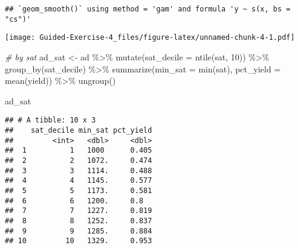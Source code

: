 \documentclass[
]{article}
\newenvironment{Shaded}{\begin{snugshade}}{\end{snugshade}}
\newcommand{\AttributeTok}[1]{\textcolor[rgb]{0.77,0.63,0.00}{#1}}
\newcommand{\CommentTok}[1]{\textcolor[rgb]{0.56,0.35,0.01}{\textit{#1}}}
\newcommand{\DecValTok}[1]{\textcolor[rgb]{0.00,0.00,0.81}{#1}}
\newcommand{\FunctionTok}[1]{\textcolor[rgb]{0.00,0.00,0.00}{#1}}
\newcommand{\NormalTok}[1]{#1}
\newcommand{\OtherTok}[1]{\textcolor[rgb]{0.56,0.35,0.01}{#1}}
\newcommand{\SpecialCharTok}[1]{\textcolor[rgb]{0.00,0.00,0.00}{#1}}
\newcommand{\StringTok}[1]{\textcolor[rgb]{0.31,0.60,0.02}{#1}}
\begin{document}
\begin{Shaded}
\end{Shaded}

\begin{verbatim}
## `geom_smooth()` using method = 'gam' and formula 'y ~ s(x, bs = "cs")'
\end{verbatim}

\texttt{[image: Guided-Exercise-4\_files/figure-latex/unnamed-chunk-4-1.pdf]}

\begin{Shaded}
\begin{Highlighting}[]
\CommentTok{\# by sat}
\NormalTok{ad\_sat }\OtherTok{\textless{}{-}}\NormalTok{ ad }\SpecialCharTok{\%\textgreater{}\%}
  \FunctionTok{mutate}\NormalTok{(}\AttributeTok{sat\_decile =} \FunctionTok{ntile}\NormalTok{(sat, }\DecValTok{10}\NormalTok{)) }\SpecialCharTok{\%\textgreater{}\%}
  \FunctionTok{group\_by}\NormalTok{(sat\_decile) }\SpecialCharTok{\%\textgreater{}\%}
  \FunctionTok{summarize}\NormalTok{(}\AttributeTok{min\_sat =} \FunctionTok{min}\NormalTok{(sat),}
            \AttributeTok{pct\_yield =} \FunctionTok{mean}\NormalTok{(yield)) }\SpecialCharTok{\%\textgreater{}\%}
  \FunctionTok{ungroup}\NormalTok{()}

\NormalTok{ad\_sat}
\end{Highlighting}
\end{Shaded}

\begin{verbatim}
## # A tibble: 10 x 3
##    sat_decile min_sat pct_yield
##         <int>   <dbl>     <dbl>
##  1          1   1000      0.405
##  2          2   1072.     0.474
##  3          3   1114.     0.488
##  4          4   1145.     0.577
##  5          5   1173.     0.581
##  6          6   1200.     0.8  
##  7          7   1227.     0.819
##  8          8   1252.     0.837
##  9          9   1285.     0.884
## 10         10   1329.     0.953
\end{verbatim}
\end{document}
